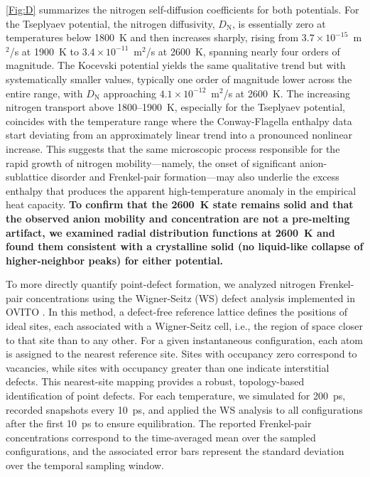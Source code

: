 \documentclass[preprint,12pt,sort&compress]{elsarticle}
\newcommand{\?}{\stackrel{?}{=}}
\providecommand{\DIFaddtex}[1]{{\bf #1}} %
\providecommand{\DIFaddbegin}{\protect\color{blue}} %
\providecommand{\DIFaddend}{\protect\color{black}} %
\providecommand{\DIFadd}[1]{\texorpdfstring{\DIFaddtex{#1}}{#1}} %
\newcommand{\DIFaddincludegraphics}[2][]{{\color{blue}\fbox{\DIFOincludegraphics[#1]{#2}}}} %
\DeclareRobustCommand{\DIFaddbegin}{\DIFOaddbegin \let\includegraphics\DIFaddincludegraphics} %
\DeclareRobustCommand{\DIFaddend}{\DIFOaddend \let\includegraphics\DIFOincludegraphics} %
\begin{document}
\cref{Fig:D} summarizes the nitrogen self-diffusion coefficients for both potentials. For the Tseplyaev potential, the nitrogen diffusivity, $D_\text{N}$, is essentially zero at temperatures below 1800~K and then increases sharply, rising from $3.7\times10^{-15}$~m$^{2}$/s at 1900~K to $3.4\times10^{-11}$~m$^{2}$/s at 2600~K, spanning nearly four orders of magnitude. The Kocevski potential yields the same qualitative trend but with systematically smaller values, typically one order of magnitude lower across the entire range, with $D_\text{N}$ approaching $4.1 \times 10^{-12}$~m$^{2}$/s at 2600~K. The increasing nitrogen transport above 1800--1900~K, especially for the Tseplyaev potential, coincides with the temperature range where the Conway-Flagella enthalpy data start deviating from an approximately linear trend into a pronounced nonlinear increase. This suggests that the same microscopic process responsible for the rapid growth of nitrogen mobility---namely, the onset of significant anion-sublattice disorder and Frenkel-pair formation---may also underlie the excess enthalpy that produces the apparent high-temperature anomaly in the empirical heat capacity. \DIFaddbegin \DIFadd{To confirm that the 2600~K state remains solid and that the observed anion mobility and concentration are not a pre-melting artifact, we examined radial distribution functions at 2600~K and found them consistent with a crystalline solid (no liquid-like collapse of higher-neighbor peaks) for either potential.
}\DIFaddend 

To more directly quantify point-defect formation, we analyzed nitrogen Frenkel-pair concentrations using the Wigner-Seitz (WS) defect analysis implemented in OVITO \cite{Stukowski2010}. In this method, a defect-free reference lattice defines the positions of ideal sites, each associated with a Wigner-Seitz cell, i.e., the region of space closer to that site than to any other. For a given instantaneous configuration, each atom is assigned to the nearest reference site. Sites with occupancy zero correspond to vacancies, while sites with occupancy greater than one indicate interstitial defects. This nearest-site mapping provides a robust, topology-based identification of point defects. For each temperature, we simulated for 200~ps, recorded snapshots every 10~ps, and applied the WS analysis to all configurations after the first 10~ps to ensure equilibration. The reported Frenkel-pair concentrations correspond to the time-averaged mean over the sampled configurations, and the associated error bars represent the standard deviation over the temporal sampling window.
\end{document}

